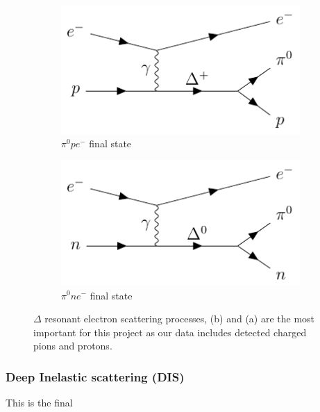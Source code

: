 \documentclass[a4paper,12pt]{article}
\begin{document}
\begin{figure}[H]
    \begin{subfigure}[b]{0.45\textwidth}
        \centering
        \includegraphics{figures/fds/RESel3.pdf}
        \caption{
            $\pi^0pe^-$ final state
        }
    \end{subfigure}
    \begin{subfigure}[b]{0.45\textwidth}
        \centering
        \includegraphics{figures/fds/RESel4.pdf}
        \caption{
            $\pi^0ne^-$ final state
        }
    \end{subfigure}
    \caption{
        $\Delta$ resonant electron scattering processes, (b) and (a) are the most important for this project as our data includes detected charged pions and protons.
    }\label{fig:RESel_fd}
\end{figure}


\subsubsection{Deep Inelastic scattering (DIS)}
This is the final 
\end{document}
